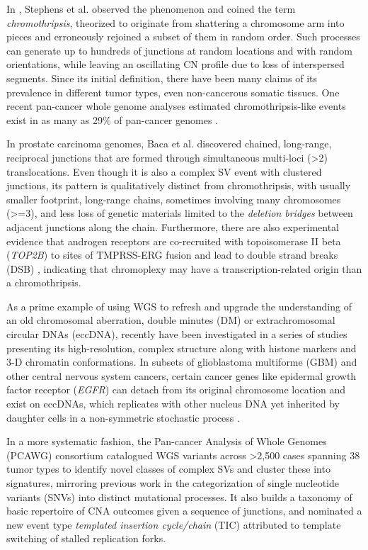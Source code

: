 \documentclass[phd,tocprelim]{cornell}
\begin{document}
In \cite{stephens2011}, Stephens et al. observed the phenomenon and coined the term \textit{chromothripsis}, theorized to originate from shattering a chromosome arm into pieces and erroneously rejoined a subset of them in random order. Such processes can generate up to hundreds of junctions at random locations and with random orientations, while leaving an oscillating CN profile due to loss of interspersed segments. Since its initial definition, there have been many claims of its prevalence in different tumor types, even non-cancerous somatic tissues. One recent pan-cancer whole genome analyses estimated chromothripsis-like events exist in as many as 29\% of pan-cancer genomes \cite{Cortes-Ciriano2020-fx}.

In prostate carcinoma genomes, Baca et al. \cite{baca2013} discovered chained, long-range, reciprocal junctions that are formed through simultaneous multi-loci (>2) translocations. Even though it is also a complex SV event with clustered junctions, its pattern is qualitatively distinct from chromothripsis, with usually smaller footprint, long-range chains, sometimes involving many chromosomes (>=3), and less loss of genetic materials limited to the \textit{deletion bridges} between adjacent junctions along the chain. Furthermore, there are also experimental evidence that androgen receptors are co-recruited with topoisomerase II beta (\textit{TOP2B}) to sites of TMPRSS-ERG fusion and lead to double strand breaks (DSB) \cite{Haffner2010-cy}, indicating that chromoplexy may have a transcription-related origin than a chromothripsis.

As a prime example of using WGS to refresh and upgrade the understanding of an old chromosomal aberration, double minutes (DM) or extrachromosomal circular DNAs (eccDNA), recently have been investigated in a series of studies \cite{Helmsauer2020-do,Wu2019-ap,Kim2020-cu} presenting its high-resolution, complex structure along with histone markers and 3-D chromatin conformations. In subsets of glioblastoma multiforme (GBM) and other central nervous system cancers, certain cancer genes like epidermal growth factor receptor (\textit{EGFR}) can detach from its original chromosome location and exist on eccDNAs, which replicates with other nucleus DNA yet inherited by daughter cells in a non-symmetric stochastic process \cite{Gaubatz1990-da}. 

In a more systematic fashion, the Pan-cancer Analysis of Whole Genomes (PCAWG) consortium catalogued WGS variants across >2,500 cases spanning 38 tumor types\cite{pcawg_marker2020-yi} to identify novel classes of complex SVs and cluster these into signatures, mirroring previous work in the categorization of single nucleotide variants (SNVs) into distinct mutational processes\cite{Li2020-ds,Alexandrov2013-zv,Nik-Zainal2012-dc,Menghi2018-er}. It also builds a taxonomy of basic repertoire of CNA outcomes given a sequence of junctions, and nominated a new event type \textit{templated insertion cycle/chain} (TIC) attributed to template switching of stalled replication forks.
\end{document}
